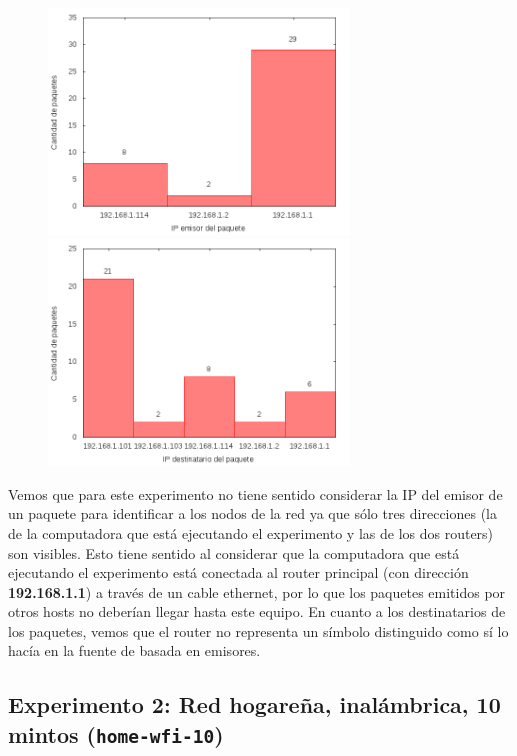 \begin{figure}[!h]
\centering
\begin{minipage}{8cm}
  \centering
  \includegraphics[width=8cm]{../mediciones/home-eth-10/home-eth-10IpsSrcArp.png}
\end{minipage}%
\begin{minipage}{8cm}
  \centering
  \includegraphics[width=8cm]{../mediciones/home-eth-10/home-eth-10IpsDstArp.png}
\end{minipage}
\end{figure}

Vemos que para este experimento no tiene sentido considerar la IP del emisor de un paquete para identificar a los nodos de la red ya que sólo tres direcciones
(la de la computadora que está ejecutando el experimento y las de los dos routers) son visibles. Esto tiene sentido al considerar que la computadora que
está ejecutando el experimento está conectada al router principal (con dirección \textbf{192.168.1.1}) a través de un cable ethernet, por lo que los paquetes emitidos
por otros hosts no deberían llegar hasta este equipo. En cuanto a los destinatarios de los paquetes, vemos que el router no representa un símbolo distinguido
como sí lo hacía en la fuente de basada en emisores.

\subsection{Experimento 2: Red hogareña, inalámbrica, 10 mintos (\texttt{home-wfi-10})}

